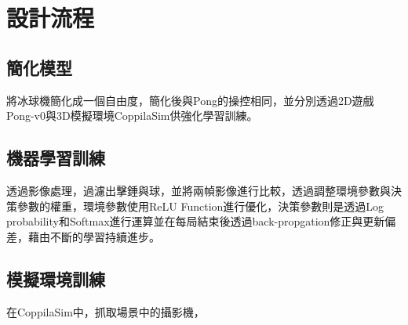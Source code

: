 \chapter{設計流程}
\section{簡化模型}
將冰球機簡化成一個自由度，簡化後與Pong的操控相同，並分別透過2D遊戲Pong-v0與3D模擬環境CoppilaSim供強化學習訓練。

\section{機器學習訓練}
透過影像處理，過濾出擊錘與球，並將兩幀影像進行比較，透過調整環境參數與決策參數的權重，環境參數使用ReLU Function進行優化，決策參數則是透過Log probability和Softmax進行運算並在每局結束後透過back-propgation修正與更新偏差，藉由不斷的學習持續進步。

\section{模擬環境訓練}
在CoppilaSim中，抓取場景中的攝影機，
